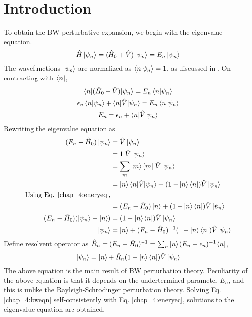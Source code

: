 \section{Introduction}
To obtain the BW perturbative expansion, we begin with the eigenvalue equation. 
\begin{equation*}
 \hat{H}\ket{\psi_n} = (\hat{H}_{0} + \hat{V})\ket{\psi_n} = E_n\ket{\psi_n}
\end{equation*}
The wavefunctions $\ket{\psi_n}$ are normalized as $\braket{n|\psi_n} = 1$, as discussed in \cite{sakurai2011modern}. On 
contracting with $\bra{n}$,
\begin{gather}
 \braket{n|(\hat{H}_{0} + \hat{V})| \psi_n} = E_n\braket{n|\psi_n} \nonumber \\
 \epsilon_n \braket{n|\psi_n} + \braket{n|\hat{V}|\psi_n} = E_n\braket{n|\psi_n} \nonumber \\
 \label{chap_4:eneryeq} E_n = \epsilon_n + \braket{n|\hat{V}|\psi_n}
\end{gather}
Rewriting the eigenvalue equation as
\begin{align*}
 (E_n - \hat{H}_{0})\ket{\psi_n} &= \hat{V}\ket{\psi_n} \\
 &= \mathrm{1}\; \hat{V}\ket{\psi_n} \\
 &= \sum_{m}{\ket{m}\bra{m}}\; \hat{V}\ket{\psi_n} \\
 &= \ket{n}\braket{n|\hat{V}|\psi_n} + (\mathrm{1} - \ket{n}\bra{n})\hat{V}\ket{\psi_n} \\
 \text{Using Eq. \ref{chap_4:eneryeq},} \\
 &= (E_n - \hat{H}_{0})\ket{n} + (\mathrm{1} - \ket{n}\bra{n})\hat{V}\ket{\psi_n} \\
 (E_n - \hat{H}_{0}) (\ket{\psi_n} - \ket{n}) &= (\mathrm{1} - \ket{n}\bra{n})\hat{V}\ket{\psi_n} \\
 \ket{\psi_n} &= \ket{n} + (E_n - \hat{H}_{0})^{-1} (\mathrm{1} - \ket{n}\bra{n})\hat{V}\ket{\psi_n}
\end{align*}
Define resolvent operator as $\hat{R}_{n} = (E_n - \hat{H}_{0})^{-1} = \sum_{n}{\ket{n}(E_n - \epsilon_n)^{-1} \bra{n}}$,
\begin{equation}
  \label{chap_4:bweqn}\ket{\psi_n} = \ket{n} +  \hat{R}_{n}(\mathrm{1} - \ket{n}\bra{n})\hat{V}\ket{\psi_n}
\end{equation}
The above equation is the main result of BW perturbation theory. Peculiarity of the above equation is that it depends on the undertermined parameter $E_n$, and this is unlike the
Rayleigh-Schrodinger perturbation theory. Solving Eq. \eqref{chap_4:bweqn} self-consistently with Eq. \eqref{chap_4:eneryeq}, solutions to the eigenvalue equation are obtained.
